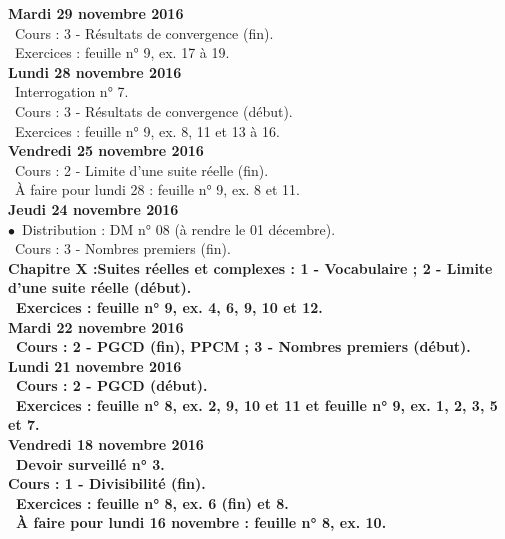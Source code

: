 \documentclass[12pt,a4paper]{article}
\begin{document}
\noindent\textbf{\bf Mardi 29 novembre 2016 }\\
\bu\ Cours : 3 - Résultats de convergence (fin).\\
\bu\ Exercices : feuille n° 9, ex. 17 à 19.\vspace{.4cm}\\

\noindent\textbf{ Lundi 28 novembre 2016 } \\
\bu\ Interrogation n° 7.\\
\bu\ Cours : 3 - Résultats de convergence (début).\\
\bu\ Exercices : feuille n° 9, ex. 8, 11 et 13 à 16.\vspace{.4cm}\\

\noindent\textbf{Vendredi 25 novembre 2016 }\\
\bu\ Cours : 2 - Limite d'une suite réelle (fin).\\
\bu\ À faire pour lundi 28 : feuille n° 9, ex. 8 et 11.\vspace{.4cm}\\

\noindent\textbf{Jeudi 24 novembre 2016 }\\
$\bullet$\ Distribution : DM n° 08 (à rendre le 01 décembre).\\
\bu\ Cours : 3 - Nombres premiers (fin).\\
\bf Chapitre X :\rm Suites réelles et complexes : 1 - Vocabulaire ; 2 - Limite 
d'une suite réelle (début).\\
\bu\ Exercices : feuille n° 9, ex. 4, 6, 9, 10 et 12.\vspace{.4cm}\\

\noindent\textbf{\bf Mardi 22 novembre 2016 }\\
\bu\ Cours : 2 - PGCD (fin), PPCM ; 3 - Nombres premiers (début).\vspace{.4cm}\\
   
\noindent\textbf{\bf Lundi 21 novembre 2016 }\\
\bu\ Cours : 2 - PGCD (début).\\
\bu\ Exercices : feuille n° 8, ex. 2, 9, 10 et 11 et feuille n° 9, ex. 1, 2, 3, 5 et 7.\vspace{.4cm}\\

\noindent\textbf{Vendredi 18 novembre 2016 }\\
\bu\ Devoir surveillé n° 3.\\
\bf Cours : 1 - Divisibilité (fin).\\
\bu\ Exercices : feuille n° 8, ex. 6 (fin) et 8.\\
\bu\ À faire pour lundi 16 novembre : feuille n° 8, ex. 10.\vspace{.4cm}\\
 
\end{document}
